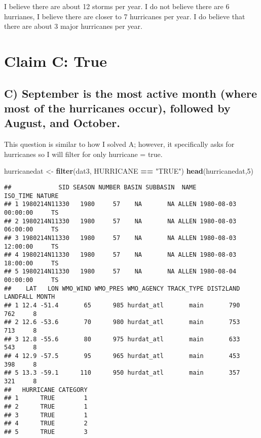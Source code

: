 \documentclass[
]{article}
\newenvironment{Shaded}{\begin{snugshade}}{\end{snugshade}}
\newcommand{\DecValTok}[1]{\textcolor[rgb]{0.00,0.00,0.81}{#1}}
\newcommand{\KeywordTok}[1]{\textcolor[rgb]{0.13,0.29,0.53}{\textbf{#1}}}
\newcommand{\NormalTok}[1]{#1}
\newcommand{\OperatorTok}[1]{\textcolor[rgb]{0.81,0.36,0.00}{\textbf{#1}}}
\newcommand{\StringTok}[1]{\textcolor[rgb]{0.31,0.60,0.02}{#1}}
\begin{document}
I believe there are about 12 storms per year. I do not believe there are
6 hurrianes, I believe there are closer to 7 hurricanes per year. I do
believe that there are about 3 major hurricanes per year.

\hypertarget{claim-c-true}{%
\section{Claim C: True}\label{claim-c-true}}

\hypertarget{c-september-is-the-most-active-month-where-most-of-the-hurricanes-occur-followed-by-august-and-october.}{%
\subsection{C) September is the most active month (where most of the
hurricanes occur), followed by August, and
October.}\label{c-september-is-the-most-active-month-where-most-of-the-hurricanes-occur-followed-by-august-and-october.}}

This question is similar to how I solved A; however, it specifically
asks for hurricanes so I will filter for only hurricane = true.

\begin{Shaded}
\begin{Highlighting}[]
\NormalTok{hurricanedat <-}\StringTok{ }\KeywordTok{filter}\NormalTok{(dat3, HURRICANE }\OperatorTok{==}\StringTok{ "TRUE"}\NormalTok{)}
\KeywordTok{head}\NormalTok{(hurricanedat,}\DecValTok{5}\NormalTok{)}
\end{Highlighting}
\end{Shaded}

\begin{verbatim}
##             SID SEASON NUMBER BASIN SUBBASIN  NAME            ISO_TIME NATURE
## 1 1980214N11330   1980     57    NA       NA ALLEN 1980-08-03 00:00:00     TS
## 2 1980214N11330   1980     57    NA       NA ALLEN 1980-08-03 06:00:00     TS
## 3 1980214N11330   1980     57    NA       NA ALLEN 1980-08-03 12:00:00     TS
## 4 1980214N11330   1980     57    NA       NA ALLEN 1980-08-03 18:00:00     TS
## 5 1980214N11330   1980     57    NA       NA ALLEN 1980-08-04 00:00:00     TS
##    LAT   LON WMO_WIND WMO_PRES WMO_AGENCY TRACK_TYPE DIST2LAND LANDFALL MONTH
## 1 12.4 -51.4       65      985 hurdat_atl       main       790      762     8
## 2 12.6 -53.6       70      980 hurdat_atl       main       753      713     8
## 3 12.8 -55.6       80      975 hurdat_atl       main       633      543     8
## 4 12.9 -57.5       95      965 hurdat_atl       main       453      398     8
## 5 13.3 -59.1      110      950 hurdat_atl       main       357      321     8
##   HURRICANE CATEGORY
## 1      TRUE        1
## 2      TRUE        1
## 3      TRUE        1
## 4      TRUE        2
## 5      TRUE        3
\end{verbatim}
\end{document}

